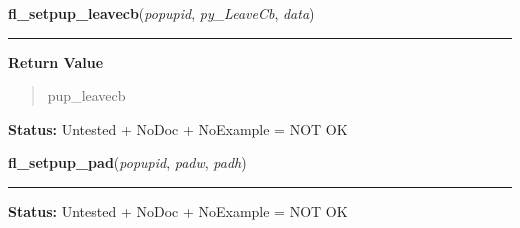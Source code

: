     \vspace{0.5ex}

\hspace{.8\funcindent}\begin{boxedminipage}{\funcwidth}

    \raggedright \textbf{fl\_setpup\_leavecb}(\textit{popupid}, \textit{py\_LeaveCb}, \textit{data})

    \vspace{-1.5ex}

    \rule{\textwidth}{0.5\fboxrule}
\setlength{\parskip}{2ex}
\setlength{\parskip}{1ex}
      \textbf{Return Value}
    \vspace{-1ex}

      \begin{quote}
      pup\_leavecb

      \end{quote}

\textbf{Status:} Untested + NoDoc + NoExample = NOT OK



    \end{boxedminipage}

    \label{xformslib:library:fl_setpup_pad}

    \vspace{0.5ex}

\hspace{.8\funcindent}\begin{boxedminipage}{\funcwidth}

    \raggedright \textbf{fl\_setpup\_pad}(\textit{popupid}, \textit{padw}, \textit{padh})

    \vspace{-1.5ex}

    \rule{\textwidth}{0.5\fboxrule}
\setlength{\parskip}{2ex}
\setlength{\parskip}{1ex}
\textbf{Status:} Untested + NoDoc + NoExample = NOT OK



    \end{boxedminipage}

    \label{xformslib:library:fl_setpup_cursor}

    \vspace{0.5ex}

